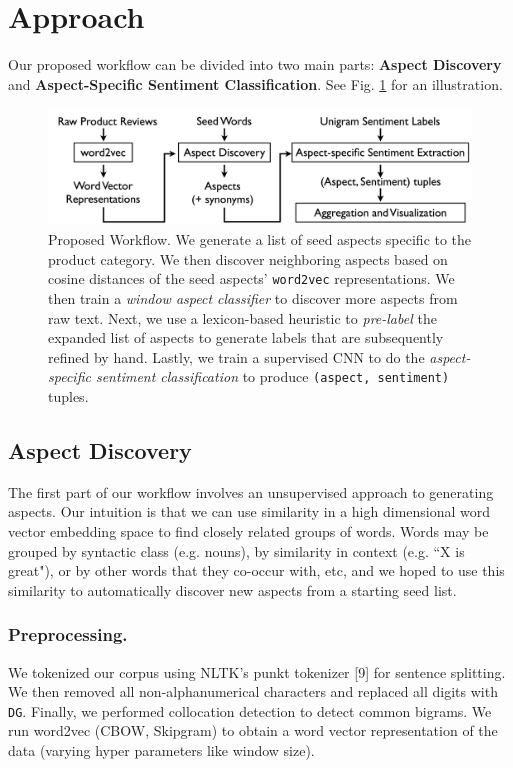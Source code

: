 \documentclass{article} %
\begin{document}

\section{Approach}

Our proposed workflow can be divided into two main parts: {\bf Aspect Discovery} and {\bf Aspect-Specific Sentiment Classification}. See Fig. \ref{workflow} for an illustration.

\begin{figure}[ht]
\begin{center}
\includegraphics[width=.85\columnwidth]{workflow.png}
\end{center}
\caption{Proposed Workflow. We generate a list of seed aspects specific to the product category. We then discover neighboring aspects based on cosine distances of the seed aspects' \texttt{word2vec} representations. We then train a \textit{window aspect classifier} to discover more aspects from raw text. Next, we use a lexicon-based heuristic to \textit{pre-label} the expanded list of aspects to generate labels that are subsequently refined by hand. Lastly, we train a supervised CNN to do the \textit{aspect-specific sentiment classification} to produce \texttt{(aspect, sentiment)} tuples.}
\label{workflow}
\end{figure}


\subsection{Aspect Discovery}

The first part of our workflow involves an unsupervised approach to generating aspects. Our intuition is that we can use similarity in a high dimensional word vector embedding space to find closely related groups of words. Words may be grouped by syntactic class (e.g. nouns), by similarity in context (e.g. ``X is great"), or by other words that they co-occur with, etc, and we hoped to use this similarity to automatically discover new aspects from a starting seed list.

\subsubsection{Preprocessing.} We tokenized our corpus using NLTK's punkt tokenizer [9] for sentence splitting. We then removed all non-alphanumerical characters and replaced all digits with \texttt{DG}. Finally, we performed collocation detection to detect common bigrams. We run word2vec (CBOW, Skipgram) to obtain a word vector representation of the data (varying hyper parameters like window size). 
\end{document}

